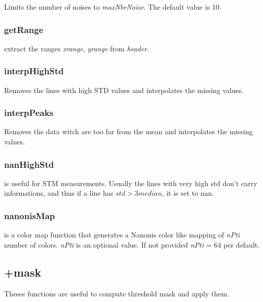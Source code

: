  Limits the number of noises to \emph{maxNbrNoise}. The default value is 10.
\edf
\subsubsection{getRange}
\bdf
{} extract the ranges \emph{xrange}, \emph{yrange} from \emph{header}.
\edf
\subsubsection{interpHighStd}
\bdf
{} Removes the lines with high STD values and interpolates the missing values.
\edf
\subsubsection{interpPeaks}
\bdf
{} Removes the data witch are too far from the mean and interpolates the missing values.
\edf
\subsubsection{nanHighStd}
\bdf
{} is useful for STM measurements. Usually the lines with very high std don't carry informations, and thus if a line has $std > 3 median$, it is set to nan.
\edf
\subsubsection{nanonisMap}
\bdf
{} is a color map function that generates a Nanonis color like mapping of \emph{nPti} number of colors. \emph{nPti} is an optional value. If not provided \emph{nPti} = 64 per default. 
\edf

\subsection{+mask}
Theses functions are useful to compute threshold mask and apply them.
